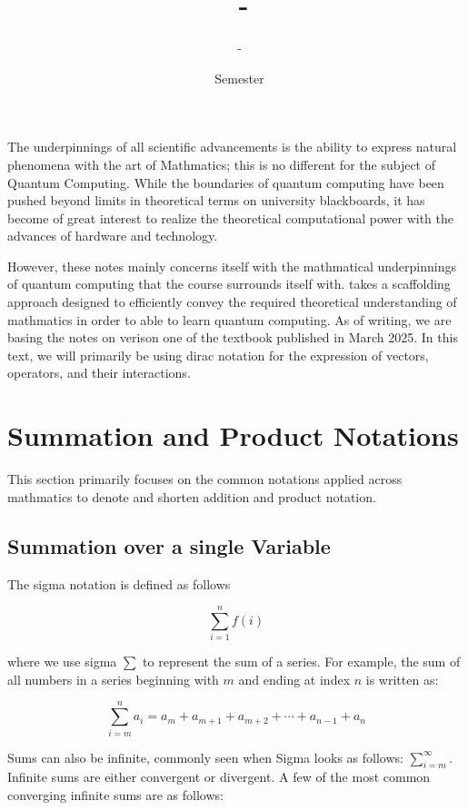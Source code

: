\documentclass[12pt]{article}
\title{\COURSECODE\ - \FULLCOURSENAME}
\author{\PROFESSORNAME\ - \STUDENTNAME}
\date{\SEMESTER\ Semester \YEAR}
\theoremstyle{definition}
\begin{document}
\maketitle

\hfill

The underpinnings of all scientific advancements is the ability to express natural phenomena with the art of Mathmatics; this is no different for the subject of Quantum Computing. While the boundaries of quantum computing have been pushed beyond limits in theoretical terms on university blackboards, it has become of great interest to realize the theoretical computational power with the advances of hardware and technology. 

However, these notes mainly concerns itself with the mathmatical underpinnings of quantum computing that the course surrounds itself with. \FULLCOURSENAME takes a scaffolding approach designed to efficiently convey the required theoretical understanding of mathmatics in order to able to learn quantum computing. As of writing, we are basing the notes on verison one of the textbook published in March 2025. In this text, we will primarily be using dirac notation for the expression of vectors, operators, and their interactions. 

\tableofcontents

\break


\section{Summation and Product Notations}

This section primarily focuses on the common notations applied across mathmatics to denote and shorten addition and product notation. 

\subsection{Summation over a single Variable}

The sigma notation is defined as follows

$$\sum_{i=1}^{n}f(i)$$

where we use sigma $\sum$ to represent the sum of a series. For example, the sum of all numbers in a series beginning with $m$ and ending at index $n$ is written as:

$$\sum_{i=m}^{n} a_i = a_m + a_{m+1} + a_{m+2} + \cdots + a_{n-1} + a_n$$

Sums can also be infinite, commonly seen when Sigma looks as follows: $\sum^{\infty}_{i=m}$. Infinite sums are either convergent or divergent. A few of the most common converging infinite sums are as follows:
\end{document}
